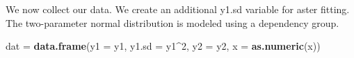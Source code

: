 \documentclass[
  ignorenonframetext,
]{beamer}
\newenvironment{Shaded}{\begin{snugshade}}{\end{snugshade}}
\newcommand{\AttributeTok}[1]{\textcolor[rgb]{0.13,0.29,0.53}{#1}}
\newcommand{\DecValTok}[1]{\textcolor[rgb]{0.00,0.00,0.81}{#1}}
\newcommand{\FunctionTok}[1]{\textcolor[rgb]{0.13,0.29,0.53}{\textbf{#1}}}
\newcommand{\NormalTok}[1]{#1}
\newcommand{\OtherTok}[1]{\textcolor[rgb]{0.56,0.35,0.01}{#1}}
\newcommand{\SpecialCharTok}[1]{\textcolor[rgb]{0.81,0.36,0.00}{\textbf{#1}}}
\begin{document}
\begin{frame}[fragile]{}
\protect\hypertarget{section-59}{}
\vspace{5pt}

We now collect our data. We create an additional y1.sd variable for
aster fitting. The two-parameter normal distribution is modeled using a
dependency group.

\vspace{12pt}
\tiny

\begin{Shaded}
\begin{Highlighting}[]
\NormalTok{dat }\OtherTok{=} \FunctionTok{data.frame}\NormalTok{(}\AttributeTok{y1 =}\NormalTok{ y1, }
                 \AttributeTok{y1.sd =}\NormalTok{ y1}\SpecialCharTok{\^{}}\DecValTok{2}\NormalTok{,}
                 \AttributeTok{y2 =}\NormalTok{ y2, }
                 \AttributeTok{x =} \FunctionTok{as.numeric}\NormalTok{(x))}
\end{Highlighting}
\end{Shaded}
\end{frame}
\end{document}
